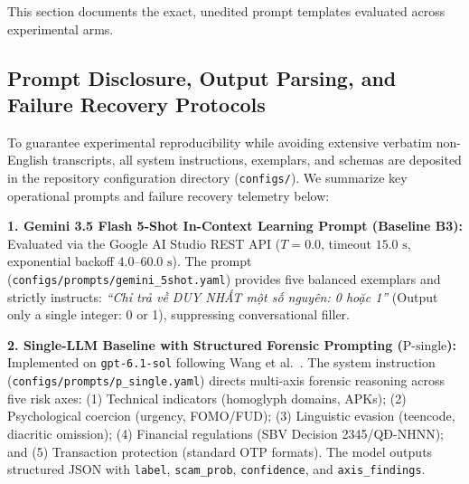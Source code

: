\documentclass[journal]{IEEEtran}
\begin{document}
This section documents the exact, unedited prompt templates evaluated across experimental arms.

\subsection{Prompt Disclosure, Output Parsing, and Failure Recovery Protocols}
\label{subsec:prompts}

To guarantee experimental reproducibility while avoiding extensive verbatim non-English transcripts, all system instructions, exemplars, and schemas are deposited in the repository configuration directory (\texttt{configs/}). We summarize key operational prompts and failure recovery telemetry below:

\textbf{1. Gemini 3.5 Flash 5-Shot In-Context Learning Prompt (Baseline B3):}
Evaluated via the Google AI Studio REST API ($T=0.0$, timeout $15.0\text{ s}$, exponential backoff $4.0\text{--}60.0\text{ s}$). The prompt (\texttt{configs/prompts/gemini\_5shot.yaml}) provides five balanced exemplars and strictly instructs: \textit{``Chỉ trả về DUY NHẤT một số nguyên: 0 hoặc 1''} (Output only a single integer: 0 or 1), suppressing conversational filler.

\textbf{2. Single-LLM Baseline with Structured Forensic Prompting ($\text{P-single}$):}
Implemented on \texttt{gpt-6.1-sol} following Wang et al.~\cite{wang2024boosting}. The system instruction (\texttt{configs/prompts/p\_single.yaml}) directs multi-axis forensic reasoning across five risk axes: (1) Technical indicators (homoglyph domains, APKs); (2) Psychological coercion (urgency, FOMO/FUD); (3) Linguistic evasion (teencode, diacritic omission); (4) Financial regulations (SBV Decision 2345/QĐ-NHNN); and (5) Transaction protection (standard OTP formats). The model outputs structured JSON with \texttt{label}, \texttt{scam\_prob}, \texttt{confidence}, and \texttt{axis\_findings}.
\end{document}
